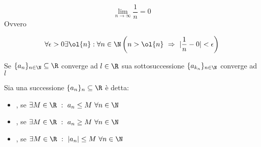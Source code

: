 \documentclass[../appunti.tex]{subfiles}
\begin{document}
\begin{esem}
\begin{equation}
	\lim \limits_{ n \to \infty} \frac{1}{n} = 0
\end{equation}
Ovvero

\begin{equation}
	\forall \epsilon > 0 \exists \ol{n}: \forall n \in \N
	\left( n > \ol{n}\ \Rightarrow\ | \frac{1}{n} - 0 | < \epsilon \right)
\end{equation}
\end{esem}



\begin{defn} 
Se $\{ a_n \}_{n \in \N} \subseteq \R$ converge ad $l \in \R$ 
sua sottosuccessione $ \{ a_{k_n} \}_{n \in \N}$ converge ad $ l $
\end{defn}



\begin{eser}



\end{eser}





\begin{defn}
Sia una successione $ \{ a_n \}_n \subseteq \R $ è detta:

\begin{itemize}
	\item {}, se 
		$ \exists M \in \R\ :\ a_n \leq M\ \forall n \in \N $
	\item {}, se
		$ \exists M \in \R\ :\ a_n \geq M\ \forall n \in \N $
	\item {}, se 
		$ \exists M \in \R\ :\ | a_n | \leq M\ \forall n \in \N $ 
\end{itemize}
\end{defn}
\end{document}
